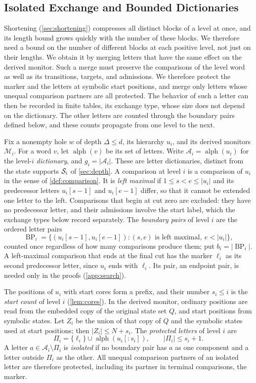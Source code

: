 \subsection{Isolated Exchange and Bounded Dictionaries}
\label{sec:dictionary}

Shortening (\cref{sec:shortening}) compresses all distinct blocks of a level at
once, and its length bound grows quickly with the number of these blocks. We
therefore need a bound on the number of different blocks at each positive level,
not just on their lengths. We obtain it by merging letters that have the same
effect on the derived monitor. Such a merge must preserve the comparisons of the
level word as well as its transitions, targets, and admissions. We therefore
protect the marker and the letters at symbolic start positions, and merge only
letters whose unequal comparison partners are all protected. The behavior of such
a letter can then be recorded in finite tables, its exchange type, whose size does
not depend on the dictionary. The other letters are counted through the boundary
pairs defined below, and these counts propagate from one level to the next.

Fix a nonempty hole $w$ of depth $\Delta\le d$, its hierarchy $u_i$, and
its derived monitors $\mathcal M_i$. For a word $v$, let
$\operatorname{alph}(v)$ be its set of letters. Write
$\mathcal A_i=\operatorname{alph}(u_i)$ for the level-$i$
\emph{dictionary}, and
$g_i=|\mathcal A_i|$. These are letter dictionaries, distinct from the
state supports $\mathcal S_i$ of \cref{sec:depth}. A comparison at level $i$
is a comparison of $u_i$ in the sense of \cref{def:comparison}.
It is \emph{left maximal} if $1\le s<e\le |u_i|$ and its predecessor
letters $u_i[s-1]$ and $u_i[e-1]$ differ, so that it cannot be extended one
letter to the left. Comparisons that begin at cut zero are excluded: they
have no predecessor letter, and their admissions involve the start label,
which the exchange types below record separately. The \emph{boundary pairs}
of level $i$ are the ordered letter pairs
\[
 \operatorname{BP}_i=\{(u_i[s-1],u_i[e-1]):
       (s,e)\text{ is left maximal},\ e<|u_i|\},
\]
counted once regardless of how many comparisons produce them; put
$b_i=|\operatorname{BP}_i|$. A left-maximal comparison that ends at the
final cut has the marker $\ell_i$ as its second predecessor letter, since
$u_i$ ends with $\ell_i$. Its pair, an endpoint pair, is needed only in the
proofs (\cref{app:search}).

The positions of $u_i$ with start cores form a prefix, and their number
$s_i\le i$ is the \emph{start count} of level $i$ (\cref{lem:cores}). In the
derived monitor, ordinary positions are read from the embedded copy of the
original state set $Q$, and start positions from symbolic states. Let $Z_i$
be the union of that copy of $Q$ and the symbolic states used at start
positions; then $|Z_i|\le N+s_i$. The \emph{protected letters} of level $i$ are
\[
 \Pi_i=\{\ell_i\}\cup\operatorname{alph}(u_i[:s_i]),
 \qquad |\Pi_i|\le s_i+1.
\]
A letter $a\in\mathcal A_i\setminus\Pi_i$ is \emph{isolated} if no
boundary pair has $a$ as one component and a letter outside $\Pi_i$ as the
other. All unequal comparison partners of an isolated letter are therefore
protected, including its partner in terminal comparisons, the marker.

